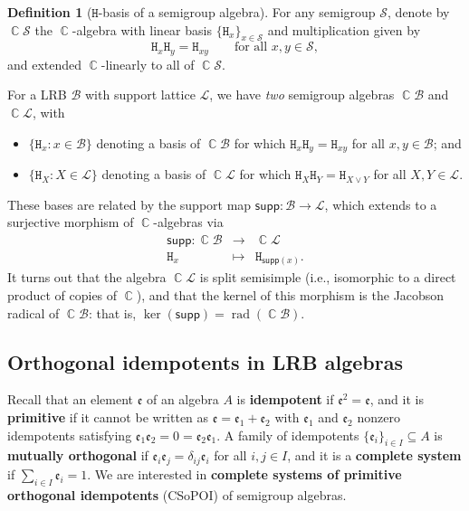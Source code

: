 \documentclass[11pt, oneside, reqno]{amsart}
\theoremstyle{definition}
\newtheorem{definition}[theorem]{Definition}
\numberwithin{equation}{section}
\DeclareMathOperator{\C}{\mathbb{C}}
\newcommand{\defn}[1]{{\color{RoyalBlue}\bf#1}}
\def \BB{{\mathcal{B}}}
\def \SS{{\mathcal{S}}}
\def \kk{\C}
\def \lat{{\mathcal{L}}}
\def \ee{{\mathfrak{e}}}
\def \supp{\mathsf{supp}}
\DeclareMathOperator{\rad}{rad} 		%
\newcommand{\B}[1]{\mathtt{#1}} 			%
\begin{document}
\begin{definition}[$\B{H}$-basis of a semigroup algebra]
For any semigroup $\SS$, denote by $\kk\SS$ the
$\kk$-algebra with linear basis $\{ \B{H}_x \}_{x \in \SS}$ and multiplication
given by
\[
    \B{H}_x\B{H}_y = \B{H}_{xy}
    \qquad
    \text{for all } x,y \in \SS,
\]
and extended $\kk$-linearly to all of $\kk\SS$.
\end{definition}

For a LRB $\BB$ with support lattice $\lat$,
we have \emph{two} semigroup algebras $\kk \BB$ and $\kk \lat$,
with
\begin{itemize}
    \item
        $\{\B{H}_x : x \in \BB\}$ denoting a basis of $\kk \BB$
        for which $\B{H}_x \B{H}_y = \B{H}_{xy}$ for all $x, y \in \BB$; and

    \item
        $\{\B{H}_X : X \in \lat\}$ denoting a basis of $\kk \lat$
        for which $\B{H}_X \B{H}_Y = \B{H}_{X \vee Y}$ for all $X, Y \in \lat$.
\end{itemize}
These bases are related by the support map $\supp: \BB \to \lat$, which extends
to a surjective morphism of $\kk$-algebras via
\begin{eqnarray*}
    \supp: \kk \BB & \longrightarrow & \kk \lat \\
    \B{H}_{x} & \longmapsto & \B{H}_{\supp(x)}.
\end{eqnarray*}
It turns out that the algebra $\kk \lat$ is split semisimple (i.e.,
isomorphic to a direct product of copies of $\kk$), and that
the kernel of this morphism is the Jacobson radical of $\kk \BB$:
that is, $\ker(\supp) = \rad(\kk\BB)$.

\subsection{Orthogonal idempotents in LRB algebras}\label{ss:CSoPOI-LRB}

Recall that an element $\ee$ of an algebra $A$ is \defn{idempotent} if
$\ee^2 = \ee$, and it is \defn{primitive} if it cannot be written as
$\ee = \ee_1 + \ee_2$ with $\ee_1$ and $\ee_2$ nonzero
idempotents satisfying $\ee_1 \ee_2 = 0 = \ee_2 \ee_1$.
A family of idempotents $\{ \ee_i \}_{i \in I} \subseteq A$
is \defn{mutually orthogonal} if $\ee_i \ee_j = \delta_{ij} \ee_{i}$
for all $i, j \in I$, and it is a \defn{complete system} if $\sum_{i \in I} \ee_i
= 1.$
We are interested in \defn{complete systems of primitive orthogonal
idempotents} (CSoPOI) of semigroup algebras.
\end{document}
